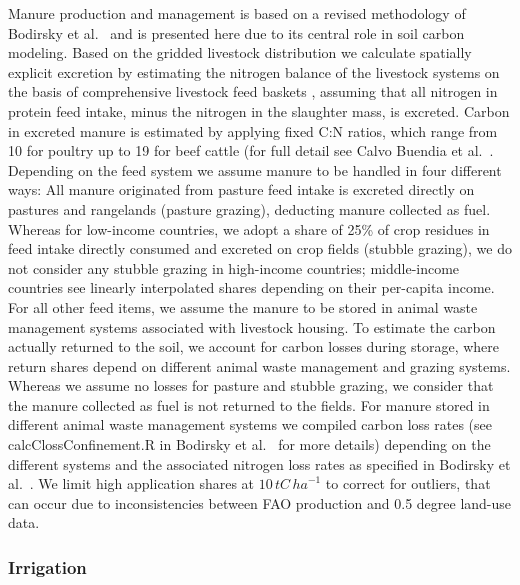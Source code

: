 \documentclass[gc, manuscript]{copernicus}
\begin{document}
Manure production and management is based on a revised methodology of Bodirsky et al.~\citeyearpar{bodirsky_n2o_2012} and is presented here due to its central role in soil carbon modeling. Based on the gridded livestock distribution we calculate spatially explicit excretion by estimating the nitrogen balance of the livestock systems on the basis of comprehensive livestock feed baskets \citep{weindl_livestock_2017}, assuming that all nitrogen in protein feed intake, minus the nitrogen in the slaughter mass, is excreted. Carbon in excreted manure is estimated by applying fixed C:N ratios, which range from 10 for poultry up to 19 for beef cattle (for full detail see Calvo Buendia et al.~\citeyearpar{ogle_cropland_in_ipcc_2019}.
Depending on the feed system we assume manure to be handled in four different ways:
All manure originated from pasture feed intake is excreted directly on pastures and rangelands (pasture grazing), deducting manure collected as fuel.
Whereas for low-income countries, we adopt a share of 25\% of crop residues in feed intake directly consumed and excreted on crop fields (stubble grazing), we do not consider any stubble grazing in high-income countries; middle-income countries see linearly interpolated shares depending on their per-capita income.
For all other feed items, we assume the manure to be stored in animal waste management systems associated with livestock housing.
To estimate the carbon actually returned to the soil, we account for carbon losses during storage, where return shares depend on different animal waste management and grazing systems. Whereas we assume no losses for pasture and stubble grazing, we consider that the manure collected as fuel is not returned to the fields. For manure stored in different animal waste management systems we compiled carbon loss rates (see calcClossConfinement.R in Bodirsky et al.~\citeyearpar{bodirsky_mrcommons_2020} for more details) depending on the different systems and the associated nitrogen loss rates as specified in Bodirsky et al.~\citeyearpar{bodirsky_n2o_2012}. We limit high application shares at \(10\,\unit{tC\,ha}^{-1}\) to correct for outliers, that can occur due to inconsistencies between FAO production and 0.5 degree land-use data.

\hypertarget{sec:irrigation}{%
\subsubsection{Irrigation}\label{sec:irrigation}}
\end{document}

